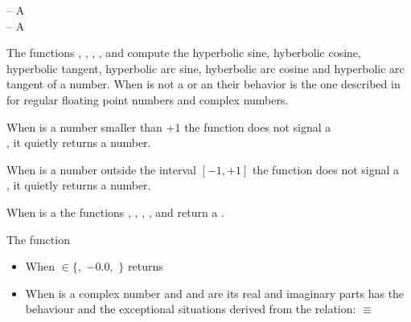 \documentclass[../Exponentials-Logarithms-Trigonometry.tex]{subfiles}
\begin{document}

\DSyntax{}

  \RArrow {}\\
  \RArrow {}\\
  \RArrow {}\\
  \RArrow {}\\
  \RArrow {}\\
  \RArrow {}

\DArgsNValues{}

 -- A \\
 -- A 

\DDescription{}

The functions , , , ,
 and  compute the hyperbolic
sine, hyberbolic cosine, hyperbolic tangent, hyperbolic
arc sine, hyberbolic arc cosine and hyperbolic arc tangent of a number. When
 is not a  or an
 their behavior is the one described in
\cite{1996:ANSIHyperSpec} for regular floating point numbers and complex
numbers.

\noindent
When  is a  number smaller than $+1$ the function
 does not signal a \\, it
quietly returns a  number.

\noindent
When  is a  number outside the interval $[-1, +1]$
the function  does not signal a \\
, it quietly
returns a  number.

\noindent
When  is a  the functions ,
, , ,  and  return
a .

\noindent
The function 
\begin{itemize}
  \item When  $\in \{$$,$
  $-0.0$$,$ $\}$ returns 
  \item When  is a complex number and   and 
  are its real and imaginary parts has the behaviour and the exceptional
  situations derived from the relation: \code{)}
  $\equiv$ \code{ (-
  }\code{)))}
\end{itemize}
\end{document}
